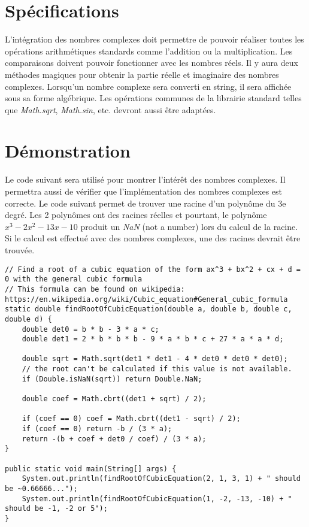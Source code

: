 \section{Spécifications}

L'intégration des nombres complexes doit permettre de pouvoir réaliser toutes les opérations arithmétiques standards comme l'addition ou la multiplication. Les comparaisons doivent pouvoir fonctionner avec les nombres réels. Il y aura deux méthodes magiques pour obtenir la partie réelle et imaginaire des nombres complexes. Lorsqu'un nombre complexe sera converti en string, il sera affichée sous sa forme algébrique. Les opérations communes de la librairie standard telles que \textit{Math.sqrt}, \textit{Math.sin}, etc. devront aussi être adaptées.

\section{Démonstration}

Le code suivant sera utilisé pour montrer l'intérêt des nombres complexes. Il permettra aussi de vérifier que l'implémentation des nombres complexes est correcte. Le code suivant permet de trouver une racine d'un polynôme du 3e degré. Les 2 polynômes ont des racines réelles et pourtant, le polynôme $x^3 - 2x^2 - 13x - 10$ produit un \textit{NaN} (not a number) lors du calcul de la racine. Si le calcul est effectué avec des nombres complexes, une des racines devrait être trouvée.
\begin{verbatim}
// Find a root of a cubic equation of the form ax^3 + bx^2 + cx + d = 0 with the general cubic formula
// This formula can be found on wikipedia: https://en.wikipedia.org/wiki/Cubic_equation#General_cubic_formula
static double findRootOfCubicEquation(double a, double b, double c, double d) {
    double det0 = b * b - 3 * a * c;
    double det1 = 2 * b * b * b - 9 * a * b * c + 27 * a * a * d;

    double sqrt = Math.sqrt(det1 * det1 - 4 * det0 * det0 * det0);
    // the root can't be calculated if this value is not available.
    if (Double.isNaN(sqrt)) return Double.NaN;

    double coef = Math.cbrt((det1 + sqrt) / 2);

    if (coef == 0) coef = Math.cbrt((det1 - sqrt) / 2);
    if (coef == 0) return -b / (3 * a);
    return -(b + coef + det0 / coef) / (3 * a);
}

public static void main(String[] args) {
    System.out.println(findRootOfCubicEquation(2, 1, 3, 1) + " should be ~0.66666...");
    System.out.println(findRootOfCubicEquation(1, -2, -13, -10) + " should be -1, -2 or 5");
}
\end{verbatim}